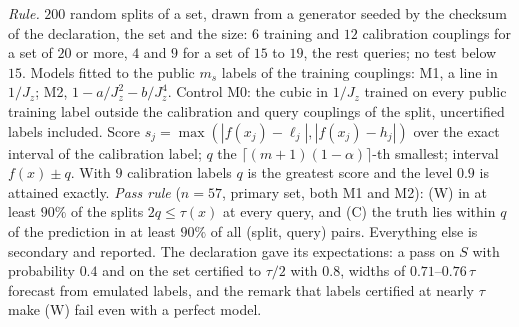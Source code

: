 \documentclass[aps,prx,onecolumn,10pt,nofootinbib,longbibliography,floatfix]{revtex4-2}
\theoremstyle{remark}
\newcommand{\Jz}{J_z}
\newcommand{\ms}{m_s}
\begin{document}
\emph{Rule.} $200$ random splits of a set, drawn from a generator seeded by the checksum of the declaration, the %
set and the size: $6$ training and $12$ calibration couplings for a set of $20$ or more, $4$ and $9$ for a set of %
$15$ to $19$, the rest queries; no test below $15$. Models fitted to the public $\ms$ labels of the training %
couplings: M1, a line in $1/\Jz$; M2, $1-a/\Jz^2-b/\Jz^4$. Control M0: the cubic in $1/\Jz$ trained on every
public training label outside the calibration and query couplings of the split, uncertified labels included.
Score $s_j=\max(|f(x_j)-\ell_j|,|f(x_j)-h_j|)$ over the exact interval of the calibration label; $q$ the
$\lceil(m+1)(1-\alpha)\rceil$-th smallest; interval $f(x)\pm q$. With $9$ calibration labels $q$ is the greatest %
score and the level $0.9$ is attained exactly. \emph{Pass rule} ($n=57$, primary set, both M1 and M2): (W) in at %
least $90\%$ of the splits $2q\le\tau(x)$ at every query, and (C) the truth lies within $q$ of the prediction in at %
least $90\%$ of all (split, query) pairs. Everything else is secondary and reported. The declaration gave its %
expectations: a pass on $S$ with probability $0.4$ and on the set certified to $\tau/2$ with $0.8$, widths of %
$0.71$--$0.76\,\tau$ forecast from emulated labels, and the remark that labels certified at nearly $\tau$ make (W) %
fail even with a perfect model.
\end{document}
